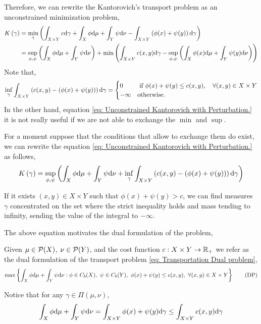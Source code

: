 Therefore, we can rewrite the Kantorovich's transport problem as an unconstrained minimization problem,    
\begin{align}
	K\left(\gamma\right)&=\min_{\gamma}\left( \int_{X\times Y} c\mathrm{d}\gamma +\int_{X} \phi \mathrm{d}\mu +\int_{Y} \psi\mathrm{d}\nu - \int_{X\times Y}\left( \phi(x)+\psi(y) \right)\mathrm{d}\gamma \right) \\
	&=\sup_{\phi,\psi}\left(  \int_{X}\phi\mathrm{d}\mu+\int_{Y}\psi\mathrm{d}\nu \right)+\min\left( \int_{X\times Y}c(x,y)\mathrm{d}\gamma-\sup_{\phi, \psi}\left( \int_{X}\phi(x)\mathrm{d}\mu+\int_{Y}\psi(y)\mathrm{d}\nu \right) \right) \label{eq: Unconstrained Kantorovich with Perturbation.}
\end{align}
Note that,
\begin{equation}
 \inf_{\gamma}\int_{X\times Y}\left( c(x,y)-\left( \phi(x)+\psi(y) \right) \right) \mathrm{d} \gamma =\begin{cases}
	0 & \text{ if } \phi(x)+\psi(y)\leq c(x,y),\quad \forall (x,y)\in X\times Y \\
	-\infty & \text{otherwise}.
 \end{cases}
\end{equation}
In the other hand, equation \eqref{eq: Unconstrained Kantorovich with Perturbation.} it is not really useful if we are not able to exchange the $\min$ and $\sup$. 

For a moment suppose that the conditions that allow to exchange them do exist, we can rewrite the equation \eqref{eq: Unconstrained Kantorovich with Perturbation.} as follows,
\begin{equation}
	K\left(\gamma\right)=\sup_{\phi, \psi}\left( \int_{X}\phi\mathrm{d}\mu+\int_{Y}\psi\mathrm{d}\nu+\inf_{\gamma}\int_{X\times Y}\left( c(x,y)-\left( \phi(x)+\psi(y) \right) \right)\mathrm{d}\gamma \right)
\end{equation}

If it exists $(x,y) \in X\times Y$ such that $\phi(x)+\psi(y)>c$, we can find measures $\gamma$ concentrated on the set where the strict inequality holds and mass tending to infinity, sending the value of the integral to $-\infty$.  

The above equation motivates the dual formulation of the problem,

\begin{problem}
Given $\mu\in\mathcal{P}(X)$, $\nu\in\mathcal{P}(Y)$, and the cost function $c:X\times Y\rightarrow \mathbb{R}_+$ we refer as the dual formulation of the transport problem \eqref{eq: Transportation Dual problem},
\begin{equation}
\max\left\lbrace \int_X\phi\mathrm{d}\mu+\int_Y\psi \mathrm{d}\nu: \phi \in C_b(X),\ \psi \in C_b(Y),\ \phi(x)+\psi(y)\leq c(x,y),\ \forall (x,y)\in X\times Y \right\rbrace \tag{DP} \label{eq: Transportation Dual problem}
\end{equation}	
\end{problem}
Notice that for any $\gamma\in \Pi(\mu, \nu)$,
\begin{equation}
	\int_{X}\phi\mathrm{d}\mu+\int_{Y}\psi\mathrm{d}\nu=\int_{X\times Y} \phi(x)+\psi(y)\mathrm{d} \gamma \leq \int_{X\times Y} c(x,y)\mathrm{d} \gamma
\end{equation}

